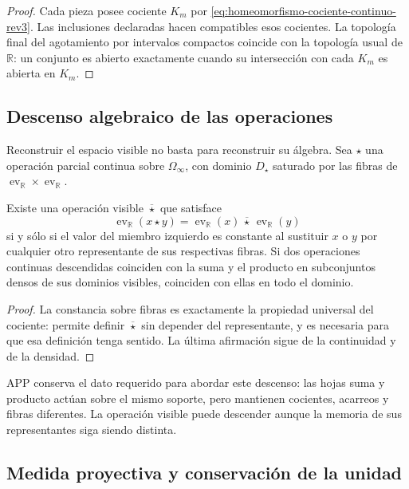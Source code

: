 \begin{proof}
Cada pieza posee cociente \(K_m\) por
\eqref{eq:homeomorfismo-cociente-continuo-rev3}. Las inclusiones declaradas
hacen compatibles esos cocientes. La topología final del agotamiento por
intervalos compactos coincide con la topología usual de \(\mathbb R\): un
conjunto es abierto exactamente cuando su intersección con cada \(K_m\) es
abierta en \(K_m\).
\end{proof}

\subsection{Descenso algebraico de las operaciones}

Reconstruir el espacio visible no basta para reconstruir su álgebra. Sea
\(\star\) una operación parcial continua sobre \(\Omega_\infty\), con dominio
\(D_\star\) saturado por las fibras de
\(\operatorname{ev}_{\mathbb R}\times\operatorname{ev}_{\mathbb R}\).

\begin{theorem}
\label{thm:descenso-operaciones-continuo-rev3}
Existe una operación visible \(\overline\star\) que satisface
\[
 \operatorname{ev}_{\mathbb R}(x\star y)
 =\operatorname{ev}_{\mathbb R}(x)\,\overline\star\,
  \operatorname{ev}_{\mathbb R}(y)
\]
si y sólo si el valor del miembro izquierdo es constante al sustituir
\(x\) o \(y\) por cualquier otro representante de sus respectivas fibras.
Si dos operaciones continuas descendidas coinciden con la suma y el producto
en subconjuntos densos de sus dominios visibles, coinciden con ellas en todo
el dominio.
\end{theorem}

\begin{proof}
La constancia sobre fibras es exactamente la propiedad universal del
cociente: permite definir \(\overline\star\) sin depender del representante,
y es necesaria para que esa definición tenga sentido. La última afirmación
sigue de la continuidad y de la densidad.
\end{proof}

APP conserva el dato requerido para abordar este descenso: las hojas suma y
producto actúan sobre el mismo soporte, pero mantienen cocientes, acarreos y
fibras diferentes. La operación visible puede descender aunque la memoria de
sus representantes siga siendo distinta.

\subsection{Medida proyectiva y conservación de la unidad}

